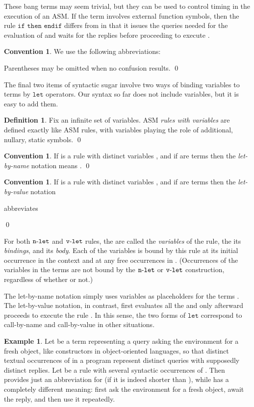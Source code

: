 \documentclass{LMCS}
\theoremstyle{definition}
\newtheorem{df}[thm]{Definition}
\newtheorem{ex}[thm]{Example}
\newtheorem{conn}[thm]{Convention}
\newcommand{\nlet}{\ensuremath{\ttt{n}\text-\ttt{let}\ }}
\newcommand{\ttt}[1]{\ensuremath{\mathtt {#1}}}
\newcommand{\vlet}{\ensuremath{\ttt{v}\text-\ttt{let}\ }}
\begin{document}
These bang terms may seem trivial, but they can be used to control
timing in the execution of an ASM.  If the term  involves external
function symbols, then the rule \ttt{if}  \ttt{then} 
\ttt{endif} differs from  in that it issues the queries needed for
the evaluation of  and waits for the replies before proceeding to
execute .

\begin{conn}
  We use the following abbreviations:

Parentheses may be omitted when no confusion results.
\qed\end{conn}

The final two items of syntactic sugar involve two ways of binding
variables to terms by \ttt{let} operators.  Our syntax so far does not
include variables, but it is easy to add them.

\begin{df}
  Fix an infinite set of variables.  ASM \emph{rules with variables}
  are defined exactly like ASM rules, with variables playing the role
  of additional, nullary, static symbols.
\qed\end{df}

\begin{conn}
  If  is a rule with distinct variables , and
  if  are terms then the \emph{let-by-name}
  notation
 means .  \qed\end{conn}

\begin{conn}
  If  is a rule with distinct variables , and
  if  are terms then the \emph{let-by-value}
  notation

abbreviates

\qed\end{conn}

For both \nlet and \vlet rules, the  are called the
\emph{variables} of the rule, the  its \emph{bindings}, and
 its \emph{body}.  Each of the variables  is
bound by this rule at its initial occurrence in the context 
and at any free occurrences in .  (Occurrences of
the variables  in the terms  are not bound by the \nlet or
\vlet construction, regardless of whether  or not.)

The let-by-name notation simply uses variables  as placeholders for
the terms .  The let-by-value notation, in contrast, first evaluates
all the  and only afterward proceeds to execute the rule .  In
this sense, the two forms of \ttt{let} correspond to call-by-name and
call-by-value in other situations.

\begin{ex} \label{ex:let} Let  be a term representing a query asking the
environment for a fresh object, like constructors in object-oriented
languages, so that distinct textual occurrences of  in a program
represent distinct queries with supposedly distinct replies.  Let 
be a rule with several syntactic occurrences of .  Then  provides just an abbreviation for  (if it is
indeed shorter than ), while  has a
completely different meaning: first ask the environment for a fresh
object, await the reply, and then use it repeatedly.
\end{ex}
\end{document}

